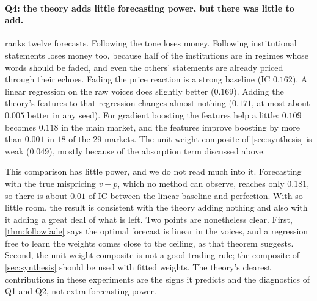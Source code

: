 \documentclass{article}
\theoremstyle{plain}
\theoremstyle{definition}
\theoremstyle{remark}
\begin{document}
\paragraph{Q4: the theory adds little forecasting power, but there was little to add.}  ranks twelve forecasts. Following the tone loses money. Following institutional statements loses money too, because half of the institutions are in regimes whose words should be faded, and even the others' statements are already priced through their echoes. Fading the price reaction is a strong baseline (IC $0.162$). A linear regression on the raw voices does slightly better ($0.169$). Adding the theory's features to that regression changes almost nothing ($0.171$, at most about $0.005$ better in any seed). For gradient boosting the features help a little: $0.109$ becomes $0.118$ in the main market, and the features improve boosting by more than $0.001$ in $18$ of the $29$ markets. The unit-weight composite of \cref{sec:synthesis} is weak ($0.049$), mostly because of the absorption term discussed above.

This comparison has little power, and we do not read much into it. Forecasting with the true mispricing $v-p$, which no method can observe, reaches only $0.181$, so there is about $0.01$ of IC between the linear baseline and perfection. With so little room, the result is consistent with the theory adding nothing and also with it adding a great deal of what is left. Two points are nonetheless clear. First, \cref{thm:followfade} says the optimal forecast is linear in the voices, and a regression free to learn the weights comes close to the ceiling, as that theorem suggests. Second, the unit-weight composite is not a good trading rule; the composite of \cref{sec:synthesis} should be used with fitted weights. The theory's clearest contributions in these experiments are the signs it predicts and the diagnostics of Q1 and Q2, not extra forecasting power.
\end{document}
